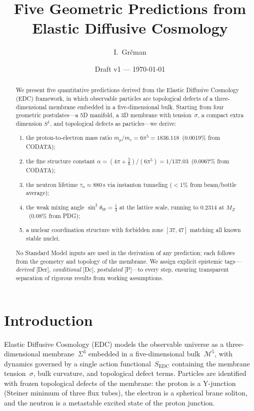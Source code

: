 \documentclass[12pt,a4paper]{article}
\title{Five Geometric Predictions from Elastic Diffusive Cosmology}
\author{I.~Gr\v{c}man}
\date{Draft v1 --- \today}
\theoremstyle{definition}
\theoremstyle{remark}
\newcommand{\tagDer}{\textsf{[Der]}}
\newcommand{\tagDc}{\textsf{[Dc]}}
\newcommand{\tagP}{\textsf{[P]}}
\newcommand{\stw}{\sin^2\!\theta_W}
\begin{document}
\maketitle

\begin{abstract}
We present five quantitative predictions derived from the Elastic
Diffusive Cosmology (EDC) framework, in which observable particles are
topological defects of a three-dimensional membrane embedded in a
five-dimensional bulk.  Starting from four geometric postulates---a 5D
manifold, a 3D membrane with tension~$\sigma$, a compact extra dimension
$S^1$, and topological defects as particles---we derive:
\begin{enumerate}[nosep]
\item the proton-to-electron mass ratio
  $m_p/m_e = 6\pi^5 = 1836.118$\
  (0.0019\% from CODATA);
\item the fine structure constant
  $\alpha = (4\pi + \tfrac{5}{6})/(6\pi^5) = 1/137.03$\
  (0.0067\% from CODATA);
\item the neutron lifetime
  $\tau_n \approx 880$\,s via instanton tunneling
  ($<1$\% from beam/bottle average);
\item the weak mixing angle
  $\stw = \tfrac{1}{4}$ at the lattice scale, running to
  $0.2314$ at $M_Z$\ (0.08\% from PDG);
\item a nuclear coordination structure with forbidden
  zone $[37,47]$ matching all known stable nuclei.
\end{enumerate}
No Standard Model inputs are used in the derivation of any
prediction; each follows from the geometry and topology of the
membrane.  We assign explicit epistemic tags---\emph{derived}
\tagDer, \emph{conditional} \tagDc, \emph{postulated}
\tagP---to every step, ensuring transparent separation of
rigorous results from working assumptions.
\end{abstract}

\section{Introduction}
\label{sec:intro}

Elastic Diffusive Cosmology (EDC) models the observable universe as a
three-dimensional membrane~$\Sigma^3$ embedded in a five-dimensional
bulk~$\mathcal{M}^5$, with dynamics governed by a single action
functional~$S_{\mathrm{EDC}}$ containing the membrane
tension~$\sigma$, bulk curvature, and topological defect terms.
Particles are identified with frozen topological defects of the
membrane: the proton is a Y-junction (Steiner minimum of three flux
tubes), the electron is a spherical brane soliton, and the neutron is
a metastable excited state of the proton junction.
\end{document}
